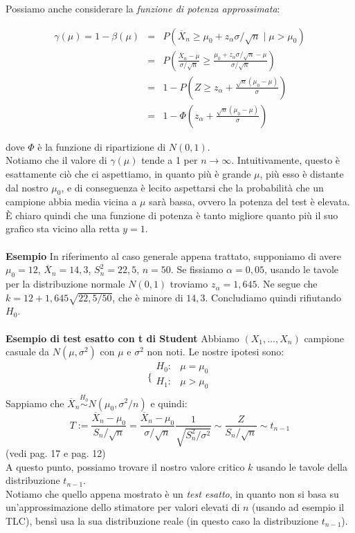 Possiamo anche considerare la \textit{funzione di potenza approssimata}:

\begin{eqnarray}
\gamma(\mu) = 1- \beta(\mu) 	&=& P(\overline{X}_n \geq \mu_0 + z_{\alpha} \sigma / \sqrt{n} \mid \mu > \mu_0) \nonumber \\
							&=& P \left(\frac{\overline{X}_n-\mu}{\sigma / \sqrt{n}} \geq \frac{\mu_0 + z_{\alpha} \sigma / \sqrt{n} - \mu}{\sigma / \sqrt{n}} \right) \nonumber \\
							&=& 1-P \left( Z \geq z_{\alpha} + \frac{\sqrt{n}(\mu_0 - \mu)}{\sigma} \right) \nonumber \\
							&=& 1-\Phi \left( z_{\alpha} + \frac{\sqrt{n}(\mu_0 - \mu)}{\sigma} \right) \nonumber
\end{eqnarray}

dove $\Phi$ è la funzione di ripartizione di $N(0,1)$.\\
Notiamo che il valore di $\gamma(\mu)$ tende a 1 per $n \rightarrow \infty$. Intuitivamente, questo è esattamente ciò che ci aspettiamo, in quanto più è grande $\mu$, più esso è distante dal nostro $\mu_0$, e di conseguenza è lecito aspettarsi che la probabilità che un campione abbia media vicina a $\mu$ sarà bassa, ovvero la potenza del test è elevata.\\
È chiaro quindi che una funzione di potenza è tanto migliore quanto più il suo grafico sta vicino alla retta $y=1$.\\
\\
\textbf{Esempio} In riferimento al caso generale appena trattato, supponiamo di avere $\mu_0=12$, $\overline{X}_n=14,3$, $S_n^2=22,5$, $n=50$. Se fissiamo $\alpha=0,05$, usando le tavole per la distribuzione normale $N(0,1)$ troviamo $z_{\alpha}=1,645$. Ne segue che $k=12+1,645\sqrt{22,5/50}$, che è minore di $14,3$. Concludiamo quindi rifiutando $H_0$.\\
\\
\textbf{Esempio di test esatto con t di Student} Abbiamo $(X_1,...,X_n)$ campione casuale da $N(\mu,\sigma^2)$ con $\mu$ e $\sigma^2$ non noti. Le nostre ipotesi sono:
$$\bigg \{
\begin{array}{rl}
H_0: & \mu=\mu_0 \\
H_1: & \mu>\mu_0 \\
\end{array}
$$
Sappiamo che $\overline{X}_n \stackrel{H_0}{\sim} N(\mu_0,\sigma^2/n)$ e quindi:
$$T:= \frac{\overline{X}_n - \mu_0}{S_n / \sqrt{n}} = \frac{\overline{X}_n - \mu_0}{\sigma / \sqrt{n}} \frac{1}{\sqrt{S_n^2 / \sigma^2}} \sim \frac{Z}{S_n / \sqrt{n}} \sim t_{n-1}$$
(vedi pag. 17 e pag. 12)\\
A questo punto, possiamo trovare il nostro valore critico $k$ usando le tavole della distribuzione $t_{n-1}$.\\
Notiamo che quello appena mostrato è un \textit{test esatto}, in quanto non si basa su un'approssimazione dello stimatore per valori elevati di $n$ (usando ad esempio il TLC), bensì usa la sua distribuzione reale (in questo caso la distribuzione $t_{n-1}$).

